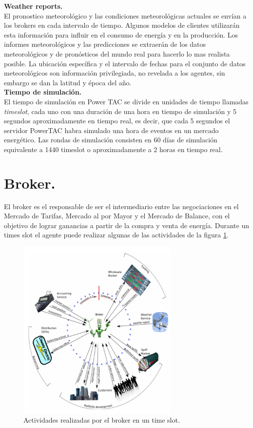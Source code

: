\textbf{Weather reports.}\\

El pronostico meteorológico y las condiciones meteorológicas actuales se envían a los brokers en cada intervalo de tiempo. Algunos modelos de clientes utilizarán esta información para influir en el consumo de energía y en la producción. Los informes meteorológicos y las predicciones se extraerán de los datos meteorológicos y de pronósticos del mundo real para hacerlo lo mas realista posible. La ubicación específica y el intervalo de fechas para el conjunto de datos meteorológicos son información privilegiada, no revelada a los agentes, sin embargo se dan la latitud y época del año.\\

\textbf{Tiempo de simulación.}\\

El tiempo de simulación en Power TAC se divide en unidades de tiempo llamadas \textit{timeslot}, cada uno con una duración de una hora en tiempo de simulación y 5 segundos aproximadamente en tiempo real, es decir, que cada 5 segundos el servidor PowerTAC habra simulado una hora de eventos en un mercado energético.
Las rondas de simulación consisten en 60 días de simulación equivalente a 1440 timeslot o aproximadamente a 2 horas en tiempo real.\\

\section{Broker.}

El broker es el responsable de ser el intermediario entre las negociaciones en el Mercado de Tarifas, Mercado al por Mayor y el Mercado de Balance, con el objetivo de lograr ganancias a partir de la compra y venta de energía. Durante un times slot el agente puede realizar algunas de las actividades de la figura \ref{fig:activity}.

\begin{figure}[!h]
	\centering
	\includegraphics[width=8cm]{img/process.png}
	\caption{Actividades realizadas por el broker en un time slot.}
	\label{fig:activity}
\end{figure}

